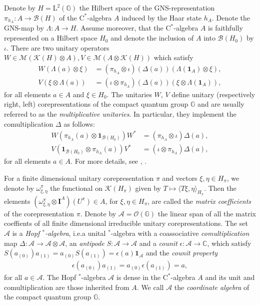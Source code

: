 \documentclass{amsart}
\theoremstyle{plain}
\theoremstyle{definition}
\theoremstyle{remark}
\begin{document}
	Denote by $H = \mathrm{L}^2(\mathbb{G})$ the Hilbert space of the GNS-representation $\pi_{h_A} : A \rightarrow \mathcal{B}(H)$ of the $\mathrm{C}^*$-algebra $A$ induced by the Haar state $h_A$.
	Denote the GNS-map by $\Lambda : A \rightarrow H$.
	Assume moreover, that the $\mathrm{C}^*$-algebra $A$ is faithfully represented on a Hilbert space $H_0$ and denote the inclusion of $A$ into $\mathcal{B}(H_0)$ by $\iota$.
	There are two unitary operators $W \in \mathcal{M}(\mathcal{K}(H) \otimes A), V \in \mathcal{M}(A \otimes \mathcal{K}(H))$ which satisfy
	\begin{align}
		W(\Lambda(a) \otimes \xi) 
		&= (\pi_{h_A} \otimes \iota)(\Delta(a))(\Lambda(\mathbf{1}_A) \otimes \xi), \\
		V(\xi \otimes \Lambda(a)) &= (\iota \otimes \pi_{h_A})(\Delta(a))(\xi \otimes \Lambda(\mathbf{1}_A)),
	\end{align}
	for all elements $a \in A$ and $\xi \in H_0$.
	The unitaries $W$, $V$ define unitary (respectively right, left) corepresentations of the compact quantum group $\mathbb{G}$ and are usually referred to as the \emph{multiplicative unitaries}.
	In particular, they implement the comultiplication $\Delta$ as follows:
	\begin{align}\label{eqn:Multiplicative-Unitary}
		W(\pi_{h_A}(a) \otimes \mathbf{1}_{\mathcal{B}(H_0)})W^* &= (\pi_{h_A} \otimes \iota) \Delta(a), \\
		V(\mathbf{1}_{\mathcal{B}(H_0)} \otimes \pi_{h_A}(a))V^* &= (\iota \otimes \pi_{h_A}) \Delta(a),
	\end{align}
	for all elements $a \in A$.
	For more details, see \cite[Section 1.5]{NT13}, \cite[Section 11.3.6]{KS97}.
	
	For a finite dimensional unitary corepresentation $\pi$ and vectors $\xi, \eta \in H_\pi$, we denote by $\omega_{\xi,\eta}^\pi$ the functional on $\mathcal{K}(H_\pi)$ given by $T \mapsto \langle T\xi, \eta \rangle_{H_\pi}$.
	Then the elements $(\omega_{\xi,\eta}^\pi \otimes \mathbf{I}^A) (U^\pi) \in A$, for $\xi, \eta \in H_\pi$, are called the \emph{matrix coefficients} of the corepresentation $\pi$.
	Denote by $\mathcal{A} = \mathcal{O}(\mathbb{G})$ the linear span of all the matrix coeffients of all finite dimensional irreducible unitary corepresentations.
	The set $\mathcal{A}$ is a \emph{Hopf $^*$-algebra}, i.e.\@ a unital $^*$-algebra with a coassociative \emph{comultiplication} map $\Delta : \mathcal{A} \rightarrow \mathcal{A} \otimes \mathcal{A}$, an \emph{antipode} $S : \mathcal{A} \rightarrow \mathcal{A}$ and a \emph{counit} $\epsilon : \mathcal{A} \rightarrow \mathbb{C}$, which satisfy $S(a_{(0)})a_{(1)} = a_{(0)}S(a_{(1)}) = \epsilon(a) \mathbf{1}_\mathcal{A}$ and the \emph{counit property}
	\begin{align}
		\epsilon(a_{(0)}) a_{(1)} = a_{(0)} \epsilon(a_{(1)}) = a,
	\end{align}
	for all $a \in \mathcal{A}$.
	The Hopf $^*$-algebra $\mathcal{A}$ is dense in the $\mathrm{C}^*$-algebra $A$ and its unit and comultiplication are those inherited from $A$.
	We call $\mathcal{A}$ the \emph{coordinate algebra} of the compact quantum group $\mathbb{G}$.
	
\end{document}
